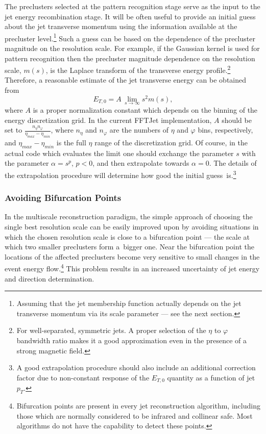\documentclass[epsf,12pt,titlepage]{article}
\begin{document}
The preclusters selected at the pattern recognition stage serve as the
input to the jet energy recombination stage. It will be often
useful to provide an initial guess about the jet transverse momentum using
the information available at the precluster
level.\footnote{Assuming that the jet membership function
actually depends on the jet transverse momentum via its
scale parameter --- see the next section.}
Such a guess
can be based on the dependence of the precluster magnitude on the
resolution scale. For example,
if the Gaussian kernel is used for pattern recognition then
the precluster magnitude dependence on the resolution
scale, $m(s)$, is the Laplace transform of the transverse
energy profile.\footnote{For well-separated, symmetric jets.
A proper selection of the $\eta$ to $\varphi$ bandwidth ratio
makes it a good approximation even in the presence of a strong
magnetic field.} Therefore, a reasonable estimate
of the jet transverse energy can be obtained from
$$E_{T,0} = A \,\lim_{s \rightarrow \infty} s^2 m(s),$$
where $A$ is a proper normalization
constant which depends on the binning of the energy discretization
grid. In the current FFTJet implementation,
$A$ should be set to $\frac{n_{\eta} n_{\varphi}}{\eta_{max} - \eta_{min}}$,
where $n_{\eta}$ and $n_{\varphi}$ are the numbers of $\eta$ and $\varphi$
bins, respectively, 
and $\eta_{max} - \eta_{min}$ is the full $\eta$ range of the
discretization grid.
Of course, in the actual code which evaluates the limit
one should exchange the parameter $s$ with the parameter $\alpha = s^p,
\,p < 0$, and then extrapolate towards $\alpha = 0$. The details of
the extrapolation procedure will determine how good the initial
guess~is.\footnote{A good 
extrapolation procedure should also include an additional correction
factor due to non-constant response of the $E_{T,0}$ quantity
as a function of jet $p_T$.}

\subsubsection{Avoiding Bifurcation Points}

In the multiscale reconstruction paradigm, the simple approach
of choosing the single best resolution scale
can be easily
improved upon by avoiding situations in which the chosen resolution
scale is close to a bifurcation point --- the scale at which
two smaller preclusters form a~bigger one.
Near the bifurcation point the locations of the affected preclusters
become very sensitive to small changes in the event energy
flow.\footnote{Bifurcation points are present
in every jet reconstruction algorithm, including those
which are normally considered to be infrared and collinear safe.
Most algorithms do not have the capability to detect these points.}
This problem results in an increased uncertainty of jet energy and
direction determination. 
\end{document}

